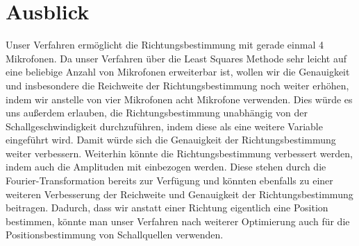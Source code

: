
\section{Ausblick}
Unser Verfahren ermöglicht die Richtungsbestimmung mit gerade einmal 4 Mikrofonen. Da unser Verfahren über die Least Squares Methode sehr leicht auf eine beliebige Anzahl von Mikrofonen erweiterbar ist, wollen wir die Genauigkeit und insbesondere die Reichweite der Richtungsbestimmung noch weiter erhöhen, indem wir anstelle von vier Mikrofonen acht Mikrofone verwenden. Dies würde es uns außerdem erlauben, die Richtungsbestimmung unabhängig von der Schallgeschwindigkeit  durchzuführen, indem diese als eine weitere Variable eingeführt wird. Damit würde sich die Genauigkeit der Richtungsbestimmung weiter verbessern.
Weiterhin könnte die Richtungsbestimmung verbessert werden, indem auch die Amplituden mit einbezogen werden. Diese stehen durch die Fourier-Transformation bereits zur Verfügung und könnten ebenfalls zu einer weiteren Verbesserung der Reichweite und Genauigkeit der Richtungsbestimmung beitragen.
Dadurch, dass wir anstatt einer Richtung eigentlich eine Position bestimmen, könnte man unser Verfahren nach weiterer Optimierung auch für die Positionsbestimmung von Schallquellen verwenden.
